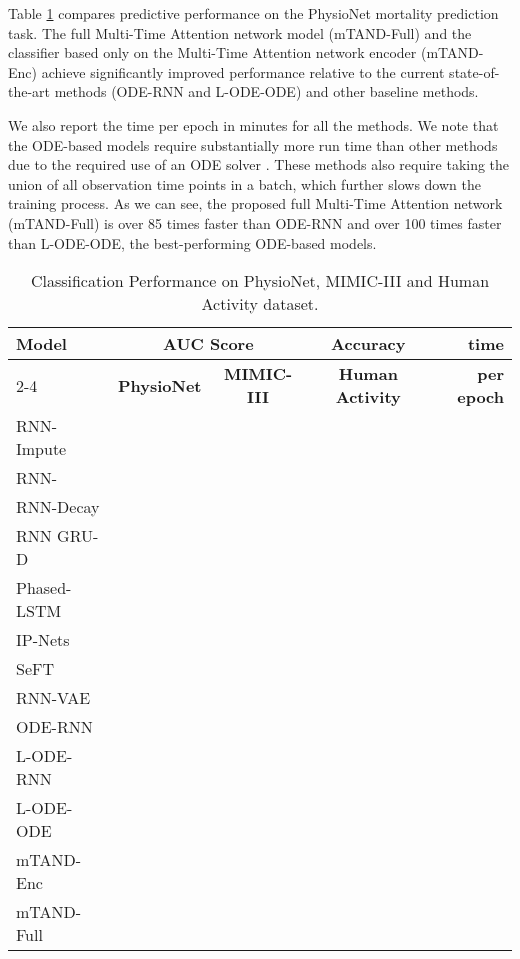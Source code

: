 \documentclass{article} \usepackage{iclr2021_conference,times}
\begin{document}
Table \ref{table:classif} compares predictive performance on the PhysioNet mortality prediction task. The full Multi-Time Attention network model (mTAND-Full) and the classifier based only on the Multi-Time Attention network encoder (mTAND-Enc) achieve significantly improved performance relative to the current state-of-the-art methods (ODE-RNN and L-ODE-ODE) and other baseline methods. 

We also report the time per epoch in minutes for all the methods. We note that the ODE-based models require substantially more run time than other methods due to the required use of an ODE solver \citep{neural_ode2018, Rubanova2019}. These methods also require taking the union of all observation time points in a batch, which further slows down the training process. As we can see, the proposed full Multi-Time Attention network (mTAND-Full) is over 85 times faster than ODE-RNN and over 100 times faster than L-ODE-ODE, the best-performing ODE-based models.









\begin{table}[t]
\centering
\footnotesize
    \caption{Classification Performance on PhysioNet, MIMIC-III and Human Activity dataset.}
    \label{table:classif}
     \begin{tabular}[h]{l c c c r}
        \toprule
        \multirow{2}{*}{\bf Model} & \multicolumn{2}{c}{\bf AUC Score} & {\bf Accuracy} & \multirow{2}{*}{\bf time}\\
        \cmidrule{2-4}
        & {\bf PhysioNet} & {\bf MIMIC-III} & {\bf Human Activity} & {\bf per epoch}\\
        \midrule
        RNN-Impute	    &  &  &  & \\
        RNN-	&  &  &  & \\
        RNN-Decay	    &  &  &  & \\
        RNN GRU-D	    &  &  &  & \\
        Phased-LSTM     &  &  &  & \\    
        IP-Nets	        &  &  &  & \\
        SeFT	        &  &  &  & \\
        RNN-VAE	        &  &  &  & \\
        ODE-RNN	        &  &  &  & \\
        L-ODE-RNN 	    &  &  &  & \\
        L-ODE-ODE	    &  &  &  & \\
        \midrule 
        {mTAND-Enc}	&  &  &  & \\
        {mTAND-Full}&  &  &  & \\
        \bottomrule
    \end{tabular}
\end{table}
\end{document}
